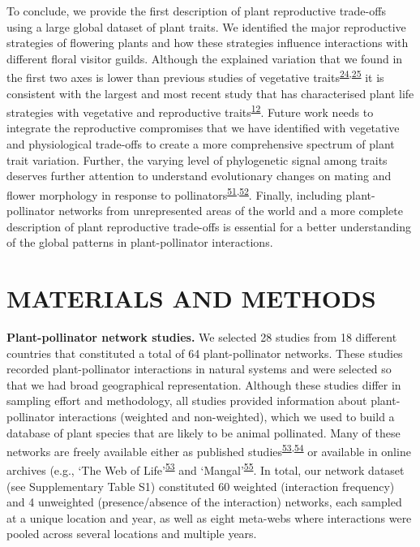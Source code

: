 \documentclass[12pt,a4paper,]{article}
\begin{document}
To conclude, we provide the first description of plant reproductive
trade-offs using a large global dataset of plant traits. We identified
the major reproductive strategies of flowering plants and how these
strategies influence interactions with different floral visitor guilds.
Although the explained variation that we found in the first two axes is
lower than previous studies of vegetative
traits\textsuperscript{\protect\hyperlink{ref-diaz2016}{24},\protect\hyperlink{ref-carmona2021}{25}}
it is consistent with the largest and most recent study that has
characterised plant life strategies with vegetative and reproductive
traits\textsuperscript{\protect\hyperlink{ref-salguero2016}{12}}. Future
work needs to integrate the reproductive compromises that we have
identified with vegetative and physiological trade-offs to create a more
comprehensive spectrum of plant trait variation. Further, the varying
level of phylogenetic signal among traits deserves further attention to
understand evolutionary changes on mating and flower morphology in
response to
pollinators\textsuperscript{\protect\hyperlink{ref-gervasi2017}{51},\protect\hyperlink{ref-mackin2021}{52}}.
Finally, including plant-pollinator networks from unrepresented areas of
the world and a more complete description of plant reproductive
trade-offs is essential for a better understanding of the global
patterns in plant-pollinator interactions.

\section{MATERIALS AND METHODS}\label{materials-and-methods}

\textbf{Plant-pollinator network studies.} We selected 28 studies from
18 different countries that constituted a total of 64 plant-pollinator
networks. These studies recorded plant-pollinator interactions in
natural systems and were selected so that we had broad geographical
representation. Although these studies differ in sampling effort and
methodology, all studies provided information about plant-pollinator
interactions (weighted and non-weighted), which we used to build a
database of plant species that are likely to be animal pollinated. Many
of these networks are freely available either as published
studies\textsuperscript{\protect\hyperlink{ref-fortuna2010}{53},\protect\hyperlink{ref-carvalheiro2014}{54}}
or available in online archives (e.g., `The Web of
Life'\textsuperscript{\protect\hyperlink{ref-fortuna2010}{53}} and
`Mangal'\textsuperscript{\protect\hyperlink{ref-poisot2016}{55}}. In
total, our network dataset (see Supplementary Table S1) constituted 60
weighted (interaction frequency) and 4 unweighted (presence/absence of
the interaction) networks, each sampled at a unique location and year,
as well as eight meta-webs where interactions were pooled across several
locations and multiple years.
\end{document}
